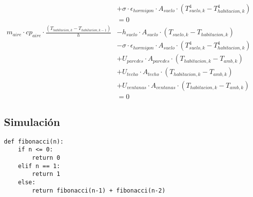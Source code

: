 \begin{align}
	                                                                                            & + \sigma \cdot \epsilon_{hormigon} \cdot A_{suelo} \cdot (T_{suelo,k}^4 - T_{habitacion,k}^4) \nonumber \\
	                                                                                            & = 0                                                                                                     \\
	m_{aire} \cdot cp_{aire} \cdot \frac{\left(T_{habitacion,k} - T_{habitacion,k-1}\right)}{h} & - h_{suelo} \cdot A_{suelo} \cdot (T_{suelo,k} - T_{habitacion,k}) \nonumber                            \\
	                                                                                            & - \sigma \cdot \epsilon_{hormigon} \cdot A_{suelo} \cdot (T_{suelo,k}^4 - T_{habitacion,k}^4) \nonumber \\
	                                                                                            & + U_{paredes} \cdot A_{paredes} \cdot (T_{habitacion,k} - T_{amb,k}) \nonumber                          \\
	                                                                                            & + U_{techo} \cdot A_{techo} \cdot (T_{habitacion,k} - T_{amb,k}) \nonumber                              \\
	                                                                                            & + U_{ventanas} \cdot A_{ventanas} \cdot (T_{habitacion,k} - T_{amb,k}) \nonumber                        \\
	                                                                                            & = 0
\end{align}


\subsection{Simulación}



\begin{verbatim}
def fibonacci(n):
    if n <= 0:
        return 0
    elif n == 1:
        return 1
    else:
        return fibonacci(n-1) + fibonacci(n-2)
\end{verbatim}
